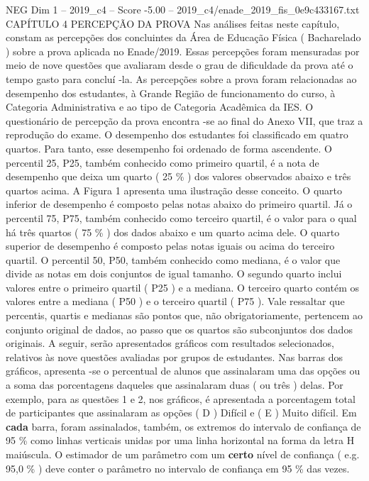 \begin{textsample}{NEG Dim 1 – 2019\_c4 – Score -5.00 – 2019\_c4/enade\_2019\_fis\_0e9c433167.txt}  \label{ex:f1_neg_088}
CAPÍTULO 4 PERCEPÇÃO DA PROVA Nas análises feitas neste capítulo, constam as percepções dos concluintes da Área de Educação Física ( Bacharelado ) sobre a prova aplicada no Enade/2019.
Essas percepções foram mensuradas por meio de nove questões que avaliaram desde o grau de dificuldade da prova até o tempo gasto para concluí -la.
As percepções sobre a prova foram relacionadas ao desempenho dos estudantes, à Grande Região de funcionamento do curso, à Categoria Administrativa e ao tipo de Categoria Acadêmica da IES.
O questionário de percepção da prova encontra -se ao final do Anexo VII, que traz a reprodução do exame.
O desempenho dos estudantes foi classificado em quatro quartos.
Para tanto, esse desempenho foi ordenado de forma ascendente.
O percentil 25, P25, também conhecido como primeiro quartil, é a nota de desempenho que deixa um quarto ( 25 \% ) dos valores observados abaixo e três quartos acima.
A Figura 1 apresenta uma ilustração desse conceito.
O quarto inferior de desempenho é composto pelas notas abaixo do primeiro quartil.
Já o percentil 75, P75, também conhecido como terceiro quartil, é o valor para o qual há três quartos ( 75 \% ) dos dados abaixo e um quarto acima dele.
O quarto superior de desempenho é composto pelas notas iguais ou acima do terceiro quartil.
O percentil 50, P50, também conhecido como mediana, é o valor que divide as notas em dois conjuntos de igual tamanho.
O segundo quarto inclui valores entre o primeiro quartil ( P25 ) e a mediana.
O terceiro quarto contém os valores entre a mediana ( P50 ) e o terceiro quartil ( P75 ).
Vale ressaltar que percentis, quartis e medianas são pontos que, não obrigatoriamente, pertencem ao conjunto original de dados, ao passo que os quartos são subconjuntos dos dados originais.
A seguir, serão apresentados gráficos com resultados selecionados, relativos às nove questões avaliadas por grupos de estudantes.
Nas barras dos gráficos, apresenta -se o percentual de alunos que assinalaram uma das opções ou a soma das porcentagens daqueles que assinalaram duas ( ou três ) delas.
Por exemplo, para as questões 1 e 2, nos gráficos, é apresentada a porcentagem total de participantes que assinalaram as opções ( D ) Difícil e ( E ) Muito difícil.
Em \textbf{cada} barra, foram assinalados, também, os extremos do intervalo de confiança de 95 \% como linhas verticais unidas por uma linha horizontal na forma da letra H maiúscula.
O estimador de um parâmetro com um \textbf{certo} nível de confiança ( e.g. 95,0 \% ) deve conter o parâmetro no intervalo de confiança em 95 \% das vezes.

\end{textsample}
